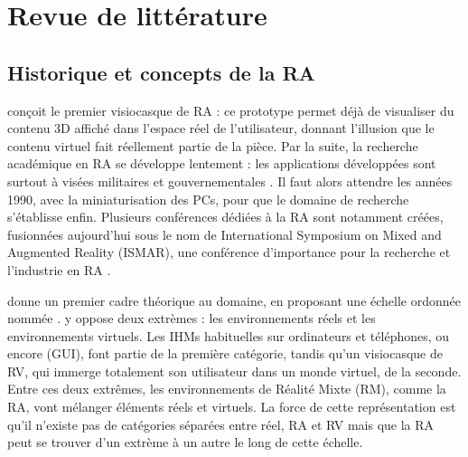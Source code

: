 \chapter{Revue de littérature}
\label{ch:litterature}

\section{Historique et concepts de la RA}
\label{sec:litterature_ar}

\cite{Sutherland1968} conçoit le premier visiocasque de RA  : ce prototype permet déjà de visualiser du contenu 3D affiché dans l'espace réel de l'utilisateur, donnant l'illusion que le contenu virtuel fait réellement partie de la pièce. Par la suite, la recherche académique en RA se développe lentement : les applications développées sont surtout à visées militaires et gouvernementales \citep{VanKrevelen2010}. Il faut alors attendre les années 1990, avec la miniaturisation des PCs, pour que le domaine de recherche s'établisse enfin. Plusieurs conférences dédiées à la RA sont notamment créées, fusionnées aujourd'hui sous le nom de International Symposium on Mixed and Augmented Reality (ISMAR), une conférence d'importance pour la recherche et l'industrie en RA \citep{Azuma2001}.


\cite{Milgram1994} donne un premier cadre théorique au domaine, en proposant une échelle ordonnée nommée  . \citeauthor{Milgram1994} y oppose deux extrèmes : les environnements réels et les environnements virtuels. Les IHMs habituelles sur ordinateurs et téléphones, ou encore  (GUI), font partie de la première catégorie, tandis qu'un visiocasque de RV, qui immerge totalement son utilisateur dans un monde virtuel, de la seconde. Entre ces deux extrêmes, les environnements de Réalité Mixte (RM), comme la RA, vont mélanger éléments réels et virtuels. La force de cette représentation est qu'il n'existe pas de catégories séparées entre réel, RA et RV mais que la RA peut se trouver d'un extrème à un autre le long de cette échelle.

